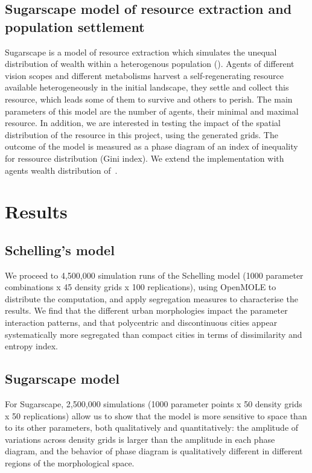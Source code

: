 \documentclass[Afour,sageh,times]{sagej}
\begin{document}
\subsection{Sugarscape model of resource extraction and population settlement}

Sugarscape is a model of resource extraction which simulates the unequal distribution of wealth within a heterogenous population (\cite{EpsteinAxtell1996}). Agents of different vision scopes and different metabolisms harvest a self-regenerating resource available heterogeneously in the initial landscape, they settle and collect this resource, which leads some of them to survive and others to perish. The main parameters of this model are the number of agents, their minimal and maximal resource. In addition, we are interested in testing the impact of the spatial distribution of the resource in this project, using the generated grids. The outcome of the model is measured as a phase diagram of an index of inequality for ressource distribution (Gini index). We extend the implementation with agents wealth distribution of~\cite{li2009netlogo}.


\section{Results}




\subsection{Schelling's model}

We proceed to 4,500,000 simulation runs of the Schelling model (1000 parameter combinations x 45 density grids x 100 replications), using OpenMOLE to distribute the computation, and apply segregation measures to characterise the results. We find that the different urban morphologies impact the parameter interaction patterns, and that polycentric and discontinuous cities appear systematically more segregated than compact cities in terms of dissimilarity and entropy index.



\subsection{Sugarscape model}

For Sugarscape, 2,500,000 simulations (1000 parameter points x 50 density grids x 50 replications) allow us to show that the model is more sensitive to space than to its other parameters, both qualitatively and quantitatively: the amplitude of variations across density grids is larger than the amplitude in each phase diagram, and the behavior of phase diagram is qualitatively different in different regions of the morphological space.
\end{document}
